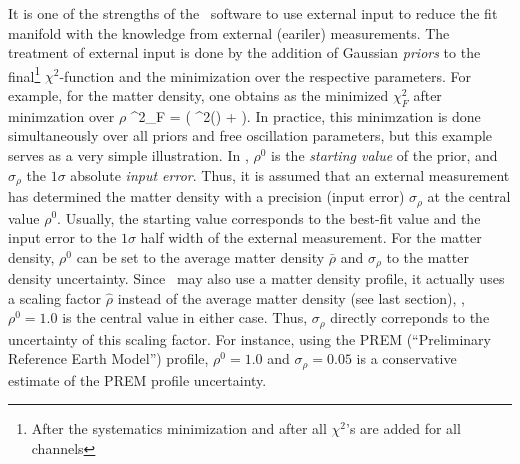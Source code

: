 It is one of the strengths of the \GLOBES\ software to use external input to reduce the fit manifold with the knowledge from external (eariler) measurements. The treatment of external input is done by the addition of Gaussian {\em priors} to the final\footnote{After the systematics minimization and after all $\chi^2$'s are added for all channels} $\chi^2$-function  and the minimization over the respective parameters. For example, for the matter density, one obtains as the minimized $\chi^2_F$ after minimzation over $\rho$
\be
 \chi^2_F =  \left( \chi^2(\rho) +  \right).
\label{equ:priors}
\ee
In practice, this minimzation is done simultaneously over all priors and free oscillation parameters, but this example serves as a very simple illustration. In , $\rho^0$ is the {\em starting value} of the prior, and $\sigma_\rho$ the $1 \sigma$ absolute {\em input error}. Thus, it is assumed that an external measurement has determined the matter density with a precision (input error) $\sigma_\rho$ at the central value $\rho^0$. Usually, the starting value corresponds to the best-fit value and the input error to the $1 \sigma$ half width of the external measurement. For the matter density, $\rho^0$ can be set to the average matter density $\bar{\rho}$ and $\sigma_\rho$ to the matter density uncertainty. Since \GLOBES\ may also use a matter density profile, it actually uses a scaling factor $\hat\rho$ instead of the average matter density (see last section), \ie, $\rho^0=1.0$ is the central value in either case. Thus, $\sigma_\rho$ directly correponds to the uncertainty of this scaling factor. For instance, using the PREM (``Preliminary Reference Earth Model'') profile, $\rho^0 = 1.0$ and $\sigma_\rho = 0.05$ is a conservative estimate of the PREM profile uncertainty.  

